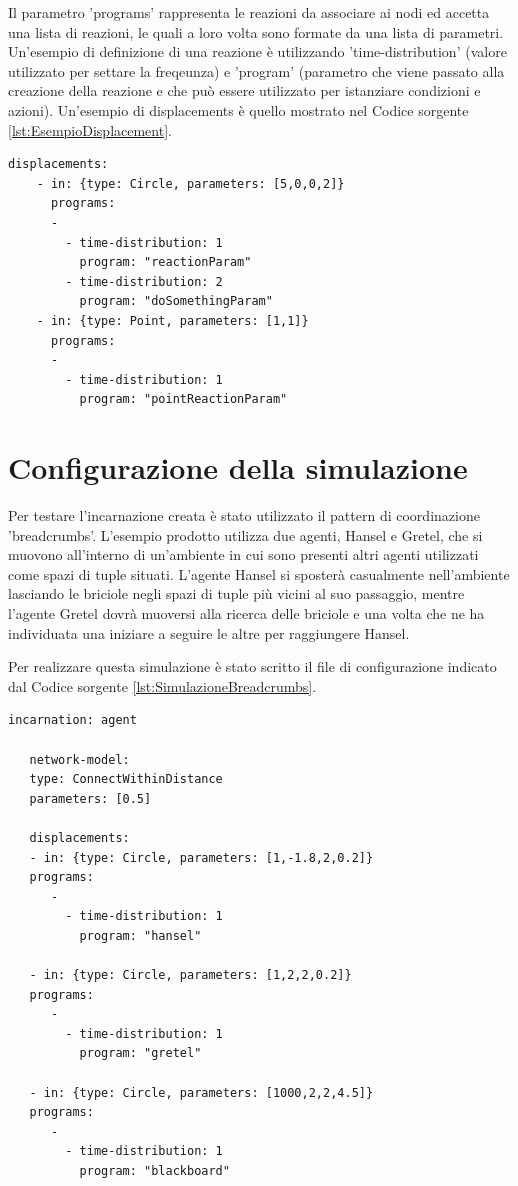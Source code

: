 \documentclass[12pt,a4paper,openright,twoside]{report}
\begin{document}
Il parametro 'programs' rappresenta le reazioni da associare ai nodi ed accetta una lista di reazioni, le quali a loro volta sono formate da una lista di parametri. Un'esempio di definizione di una reazione \`e utilizzando 'time-distribution' (valore utilizzato per settare la freqeunza) e 'program' (parametro che viene passato alla creazione della reazione e che pu\`o essere utilizzato per istanziare condizioni e azioni).
Un'esempio di displacements \`e quello mostrato nel Codice sorgente \ref{lst:EsempioDisplacement}.
\medskip
\begin{lstlisting}[firstnumber=last,label={lst:EsempioDisplacement},caption={Disposizione nodi e reazioni associate}]
  displacements:
    - in: {type: Circle, parameters: [5,0,0,2]}
      programs:
      -
        - time-distribution: 1
          program: "reactionParam"
        - time-distribution: 2
          program: "doSomethingParam"
    - in: {type: Point, parameters: [1,1]}
      programs:
      -
        - time-distribution: 1
          program: "pointReactionParam"
\end{lstlisting}

\section{Configurazione della simulazione}
Per testare l'incarnazione creata \`e stato utilizzato il pattern di coordinazione 'breadcrumbs'. L'esempio prodotto utilizza due agenti, Hansel e Gretel, che si muovono all'interno di un'ambiente in cui sono presenti altri agenti utilizzati come spazi di tuple situati. L'agente Hansel si sposter\`a casualmente nell'ambiente lasciando le briciole negli spazi di tuple pi\`u vicini al suo passaggio, mentre l'agente Gretel dovr\`a muoversi alla ricerca delle briciole e una volta che ne ha individuata una iniziare a seguire le altre per raggiungere Hansel.

Per realizzare questa simulazione \`e stato scritto il file di configurazione indicato dal Codice sorgente \ref{lst:SimulazioneBreadcrumbs}.
\medskip
\begin{lstlisting}[firstnumber=1,label={lst:SimulazioneBreadcrumbs},caption={Simulazione modello Spatial Tuples con modello di coordinazione breadcrumbs}]
   incarnation: agent

   network-model:
   type: ConnectWithinDistance
   parameters: [0.5]

   displacements:
   - in: {type: Circle, parameters: [1,-1.8,2,0.2]}
   programs:
      -
        - time-distribution: 1
          program: "hansel"

   - in: {type: Circle, parameters: [1,2,2,0.2]}
   programs:
      -
        - time-distribution: 1
          program: "gretel"

   - in: {type: Circle, parameters: [1000,2,2,4.5]}
   programs:
      -
        - time-distribution: 1
          program: "blackboard"
\end{lstlisting}
\end{document}
